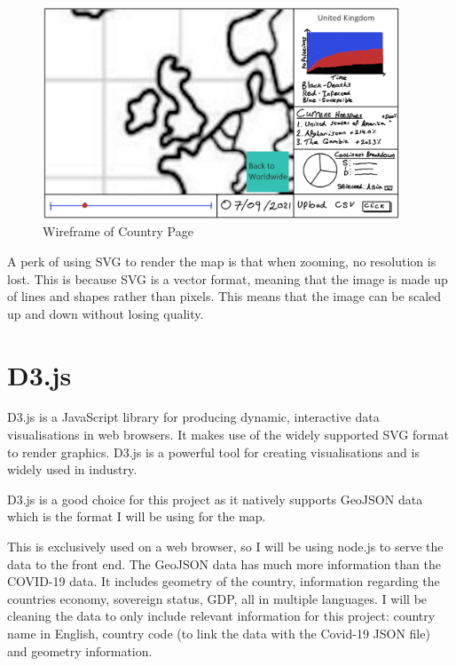 \documentclass{report}
\begin{document}
\begin{center}
    \begin{figure}[h]
        \centering
        \includegraphics[width=0.95\textwidth]{Images/Country_Wireframe.png}
        \caption{Wireframe of Country Page}
        \label{fig:wireframe_country}
    \end{figure}
\end{center}
A perk of using SVG to render the map is that when zooming, no resolution is lost. This is because SVG is a vector format, meaning that the image is made up of lines and shapes rather than pixels. This means that the image can be scaled up and down without losing quality.
\section{D3.js}
D3.js is a JavaScript library for producing dynamic, interactive data visualisations in web browsers. It makes use of the widely supported SVG format to render graphics. D3.js is a powerful tool for creating visualisations and is widely used in industry.

D3.js is a good choice for this project as it natively supports GeoJSON data which is the format I will be using for the map. \cite{geojsonvectormaps}

This is exclusively used on a web browser, so I will be using node.js to serve the data to the front end.
\newpage
The GeoJSON data has much more information than the COVID-19 data. It includes geometry of the country, information regarding the countries economy, sovereign status, GDP, all in multiple languages. I will be cleaning the data to only include relevant information for this project: country name in English, country code (to link the data with the Covid-19 JSON file) and geometry information. 
\newpage
\end{document}
